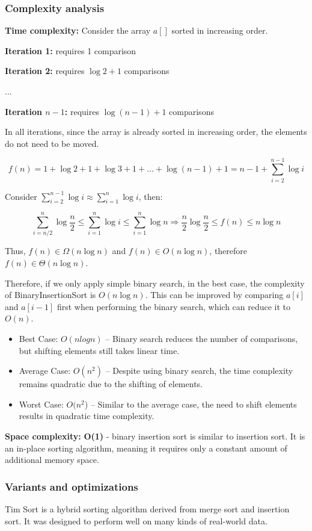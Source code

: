 \subsubsection{Complexity analysis}

\textbf{Time complexity:}
Consider the array $a[]$ sorted in increasing order.

\textbf{Iteration 1:} requires 1 comparison

\textbf{Iteration 2:} requires $\log 2 + 1$ comparisons

...

\textbf{Iteration $n - 1$:} requires $\log(n - 1) + 1$ comparisons

In all iterations, since the array is already sorted in increasing order, the elements do not need to be moved.

\[
f(n) = 1 + \log 2 + 1 + \log 3 + 1 + \ldots + \log(n - 1) + 1 = n - 1 + \sum_{i=2}^{n-1} \log i
\]

Consider \(\displaystyle \sum_{i=2}^{n-1} \log i \approx \sum_{i=1}^{n} \log i \), then:

\[
\sum_{i=n/2}^{n} \log \frac{n}{2} \leq \sum_{i=1}^{n} \log i \leq \sum_{i=1}^{n} \log n \Rightarrow \frac{n}{2} \log \frac{n}{2} \leq f(n) \leq n \log n
\]

Thus, $f(n) \in \Omega(n \log n)$ and $f(n) \in O(n \log n)$, therefore $f(n) \in \Theta(n \log n)$.

Therefore, if we only apply simple binary search, in the best case, the complexity of BinaryInsertionSort is $O(n \log n)$. This can be improved by comparing $a[i]$ and $a[i-1]$ first when performing the binary search, which can reduce it to $O(n)$.
\begin{itemize}
    \item Best Case: $O(n log n)$ – Binary search reduces the number of comparisons, but shifting elements still takes linear time.
    \item Average Case: $O(n^2)$ – Despite using binary search, the time complexity remains quadratic due to the shifting of elements.
    \item Worst Case: $O(n^2$) – Similar to the average case, the need to shift elements results in quadratic time complexity.
\end{itemize}

\textbf{Space complexity:} \textbf{O(1)} - binary insertion sort is similar to insertion sort.  It is an in-place sorting algorithm, meaning it requires only a constant amount of additional memory space.

\subsubsection{Variants and optimizations}
Tim Sort is a hybrid sorting algorithm derived from merge sort and insertion sort. It was designed to perform well on many kinds of real-world data. ~\cite{ref11}

\vspace{10pt}